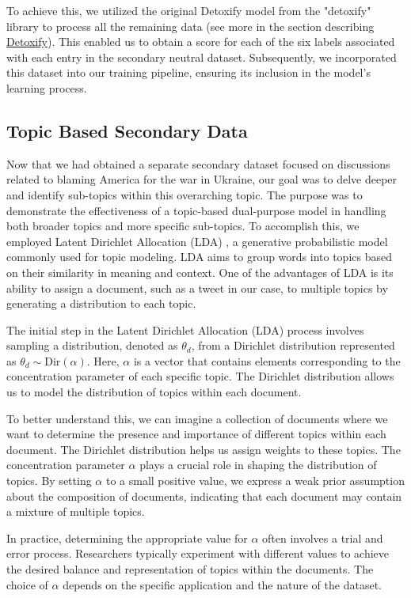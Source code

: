 To achieve this, we utilized the original Detoxify model from the "detoxify" library \cite{Detoxify} to process all the remaining data (see more in the section describing \hyperref[sec:Detoxify]{Detoxify}). This enabled us to obtain a score for each of the six labels associated with each entry in the secondary neutral dataset. Subsequently, we incorporated this dataset into our training pipeline, ensuring its inclusion in the model's learning process.

\subsection{Topic Based Secondary Data}
\label{topic_based_sec_data}

Now that we had obtained a separate secondary dataset focused on discussions related to blaming America for the war in Ukraine, our goal was to delve deeper and identify sub-topics within this overarching topic. The purpose was to demonstrate the effectiveness of a topic-based dual-purpose model in handling both broader topics and more specific sub-topics. To accomplish this, we employed Latent Dirichlet Allocation (LDA) \cite{lda}, a generative probabilistic model commonly used for topic modeling. LDA aims to group words into topics based on their similarity in meaning and context. One of the advantages of LDA is its ability to assign a document, such as a tweet in our case, to multiple topics by generating a distribution to each topic.

The initial step in the Latent Dirichlet Allocation (LDA) process involves sampling a distribution, denoted as $\theta_{d}$, from a Dirichlet distribution represented as $\theta_{d} \sim \text{Dir}(\alpha)$. Here, $\alpha$ is a vector that contains elements corresponding to the concentration parameter of each specific topic. The Dirichlet distribution allows us to model the distribution of topics within each document.

To better understand this, we can imagine a collection of documents where we want to determine the presence and importance of different topics within each document. The Dirichlet distribution helps us assign weights to these topics. The concentration parameter $\alpha$ plays a crucial role in shaping the distribution of topics. By setting $\alpha$ to a small positive value, we express a weak prior assumption about the composition of documents, indicating that each document may contain a mixture of multiple topics.

In practice, determining the appropriate value for $\alpha$ often involves a trial and error process. Researchers typically experiment with different values to achieve the desired balance and representation of topics within the documents. The choice of $\alpha$ depends on the specific application and the nature of the dataset.

